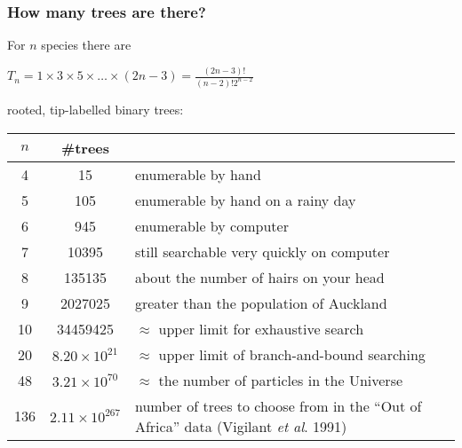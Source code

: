 \begin{frame}[plain]
\frametitle{How many trees are there?}

For $n$ species there are

\medskip{}

\begin{centering}

$T_n = 1 \times 3 \times 5 \times \dots \times (2n - 3) = \frac{(2n-3)!}{(n-2)!2^{n-2}}$ 

\end{centering}

\medskip{}

rooted, tip-labelled binary trees:

\medskip{}

\small{

\begin{tabular}{ccp{}} \hline
$n$ & \#trees & \\ \hline
4& 15 &enumerable by hand\\
5& 105 &enumerable by hand on a rainy day\\
6& 945 &enumerable by computer\\
7& 10395 &still searchable very quickly on computer\\
8& 135135 & about the number of hairs on your head\\
9& 2027025 & greater than the population of Auckland\\
10& 34459425 & $\approx$ upper limit for exhaustive search\\
20& $8.20 \times 10^{21}$ & $\approx$ upper limit of branch-and-bound searching\\
48& $3.21 \times 10^{70}$ & $\approx$ the number of particles in the Universe\\
136& $2.11 \times 10^{267}$ & number of trees to choose from in the ``Out of Africa'' data (Vigilant \textit{et al}. 1991)\\
\hline
\end{tabular}

}

\end{frame}
